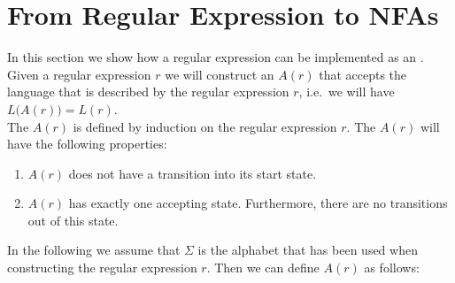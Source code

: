 \section{From Regular Expression to NFAs \label{section:regexp-2-nfa}}
In this section we show how a regular expression can be implemented as an .
Given a regular expression $r$ we will construct an  $A(r)$ that accepts the
language that is described by the regular expression $r$, i.e.~we will have
\\[0.2cm]
\hspace*{1.3cm}
$L\bigl(A(r)\bigr) = L(r)$.
\\[0.2cm]
The  $A(r)$ is defined by induction on the regular expression $r$.  The  $A(r)$ will
have the following properties:
\begin{enumerate}
\item $A(r)$ does not have a transition into its start state.  
\item $A(r)$ has exactly one accepting state.  
      Furthermore, there are no transitions out of this state.
\end{enumerate}
In the following we assume that $\Sigma$ is the alphabet that has been used when constructing the regular
expression $r$.  Then we can define $A(r)$ as follows:
